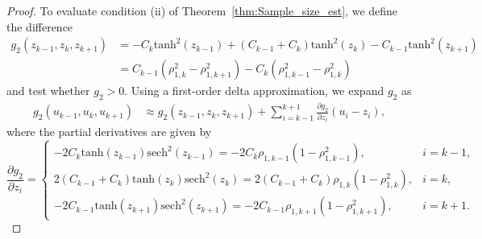 \begin{proof}
To evaluate condition (ii) of Theorem~\ref{thm:Sample_size_est}, we define the difference
%
\begin{align*}
    g_2 (z_{k-1},z_k,z_{k+1})&=-C_{k}\text{tanh}^2(z_{k-1}) + (C_{k-1} + C_k)\text{tanh}^2(z_{k})-C_{k-1}\text{tanh}^2(z_{k+1})\\
    &=C_{k-1}(\rho_{1,k}^2-\rho_{1,k+1}^2) - C_k (\rho_{1,k-1}^2 - \rho_{1,k}^2)
\end{align*}
%
and test whether $g_2 > 0$. Using a first-order delta approximation, we expand $g_2$ as
%
\begin{align*}
    g_2(u_{k-1},u_k,u_{k+1})  &\approx g_2(z_{k-1},z_k,z_{k+1}) +  \sum_{i=k-1}^{k+1}\frac{\partial g_2}{\partial z_i}(u_i - z_i),
\end{align*}
%
where the partial derivatives are given by
%
\begin{equation*}
    \frac{\partial g_2}{\partial z_i}= \left\{\begin{array}{ll}
-2C_k\text{tanh}(z_{k-1})\text{sech}^2(z_{k-1})=-2C_k\rho_{1,k-1}(1- \rho_{1,k-1}^2), & i=k-1,\\
2(C_{k-1} + C_k)\text{tanh}(z_{k})\text{sech}^2(z_{k})=2(C_{k-1} + C_k) \rho_{1,k}(1- \rho_{1,k}^2), & i=k,\\
- 2C_{k-1}\text{tanh}(z_{k+1})\text{sech}^2(z_{k+1})=- 2C_{k-1} \rho_{1,k+1}(1- \rho_{1,k+1}^2), & i=k+1.
\end{array}
\right.
\end{equation*}
%


\end{proof}
